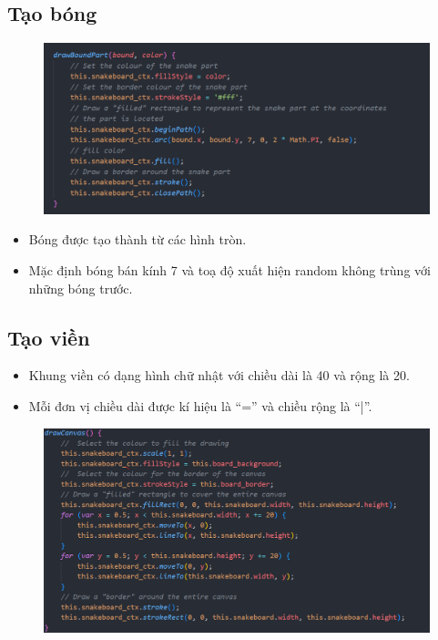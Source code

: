 \documentclass[../main-report.tex]{subfiles}
\begin{document}
\subsection{Tạo bóng}
\begin{figure}[ht]
    \centering
    \includegraphics[scale=0.4]{hinh/bound.png}
\end{figure}
\begin{itemize}
    \item Bóng được tạo thành từ các hình tròn.
    \item Mặc định bóng bán kính 7 và toạ độ xuất hiện random không trùng với những bóng trước.
\end{itemize}
\subsection{Tạo viền}
\begin{itemize}
    \item Khung viền có dạng hình chữ nhật với chiều dài là 40 và rộng là 20.
    \item Mỗi đơn vị chiều dài được kí hiệu là “=” và chiều rộng là “|”.
\end{itemize}
\begin{figure}[ht]
    \centering
    \includegraphics[scale=0.4]{chapters/hinh/snake6.png}
\end{figure}
\end{document}
